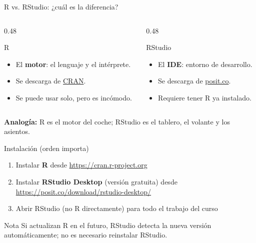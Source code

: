 \documentclass[aspectratio=169]{beamer}
\begin{document}
\begin{frame}{R vs. RStudio: ¿cuál es la diferencia?}
\begin{columns}[T]
\begin{column}{0.48\textwidth}
\begin{exampleblock}{R}
\begin{itemize}
  \item El \textbf{motor}: el lenguaje y el intérprete.
  \item Se descarga de \href{https://cran.r-project.org}{CRAN}.
  \item Se puede usar solo, pero es incómodo.
\end{itemize}
\end{exampleblock}
\end{column}
\begin{column}{0.48\textwidth}
\begin{exampleblock}{RStudio}
\begin{itemize}
  \item El \textbf{IDE}: entorno de desarrollo.
  \item Se descarga de \href{https://posit.co/download/rstudio-desktop/}{posit.co}.
  \item Requiere tener R ya instalado.
\end{itemize}
\end{exampleblock}
\end{column}
\end{columns}

\vspace{0.5cm}
\pause
\centering
\textbf{Analogía:} R es el motor del coche; RStudio es el tablero, el volante y los asientos.
\end{frame}

\begin{frame}{Instalación (orden importa)}
\begin{enumerate}
  \item<1-> Instalar \textbf{R} desde \url{https://cran.r-project.org}
  \item<2-> Instalar \textbf{RStudio Desktop} (versión gratuita) desde \url{https://posit.co/download/rstudio-desktop/}
  \item<3-> Abrir RStudio (no R directamente) para todo el trabajo del curso
\end{enumerate}

\vspace{0.3cm}
\pause
\begin{alertblock}{Nota}
Si actualizan R en el futuro, RStudio detecta la nueva versión automáticamente; no es necesario reinstalar RStudio.
\end{alertblock}
\end{frame}
\end{document}
